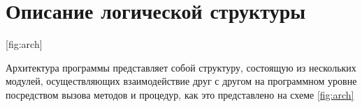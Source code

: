 \newpage
\section{Описание логической структуры}
[fig:arch]

Архитектура программы представляет собой структуру, состоящую из нескольких модулей, осуществляющих взаимодействие друг с другом на программном уровне посредством вызова методов и процедур, как это представлено на схеме \ref{fig:arch}